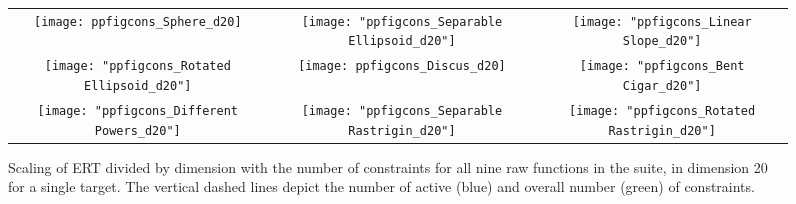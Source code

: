 \documentclass[sigconf]{acmart}
\begin{document}
{%


\begin{figure*}
 \begin{tabular}{@{}c@{}c@{}c@{}}
 \texttt{[image: ppfigcons\_Sphere\_d20]} & 
 \texttt{[image: "ppfigcons\_Separable Ellipsoid\_d20"]} &
 \texttt{[image: "ppfigcons\_Linear Slope\_d20"]}\\
 \texttt{[image: "ppfigcons\_Rotated Ellipsoid\_d20"]} & 
 \texttt{[image: ppfigcons\_Discus\_d20]} &
 \texttt{[image: "ppfigcons\_Bent Cigar\_d20"]}\\ 
 \texttt{[image: "ppfigcons\_Different Powers\_d20"]} & 
 \texttt{[image: "ppfigcons\_Separable Rastrigin\_d20"]} &
 \texttt{[image: "ppfigcons\_Rotated Rastrigin\_d20"]}\\ 
 \end{tabular}
\caption{
\label{fig:scalingconstraints20D}
Scaling of ERT divided by dimension with the number of constraints for all nine raw functions in the \bbobcons suite, in dimension 20 for a single target. The vertical dashed lines depict the number of active (blue) and overall number (green) of constraints.
}
\end{figure*}



}
\end{document}

